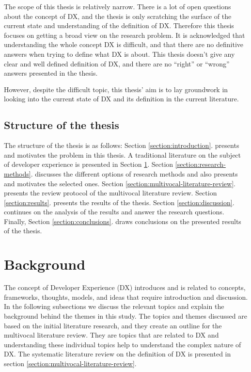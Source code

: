 \documentclass[english, 12pt, a4paper, sci, utf8, a-1b, online]{aaltothesis}
\begin{document}
The scope of this thesis is relatively narrow. There is a lot of open questions about the concept of DX, and the thesis is only scratching the surface of the current state and understanding of the definition of DX. Therefore this thesis focuses on getting a broad view on the research problem. It is acknowledged that understanding the whole concept DX is difficult, and that there are no definitive answers when trying to define what DX is about. This thesis doesn't give any clear and well defined definition of DX, and there are no ``right'' or ``wrong'' answers presented in the thesis.

However, despite the difficult topic, this thesis' aim is to lay groundwork in looking into the current state of DX and its definition in the current literature.

\subsection{Structure of the thesis}

The structure of the thesis is as follows: Section \ref{section:introduction}. presents and motivates the problem in this thesis. A traditional literature on the subject of developer experience is presented in Section \ref{section:background}. Section \ref{section:research-methods}. discusses the different options of research methods and also presents and motivates the selected ones. Section \ref{section:multivocal-literature-review}. presents the review protocol of the multivocal literature review. Section \ref{section:results}. presents the results of the thesis. Section \ref{section:discussion}. continues on the analysis of the results and answer the research questions. Finally, Section \ref{section:conclusions}. draws conclusions on the presented results of the thesis.

\clearpage
\section{Background} \label{section:background}

The concept of Developer Experience (DX) introduces and is related to concepts, frameworks, thoughts, models, and ideas that require introduction and discussion. In the following subsections we discuss the relevant topics and explain the background behind the themes in this study. The topics and themes discussed are based on the initial literature research, and they create an outline for the multivocal literature review. They are topics that are related to DX and understanding these individual topics help to understand the complex nature of DX. The systematic literature review on the definition of DX is presented in section \ref{section:multivocal-literature-review}.
\end{document}
